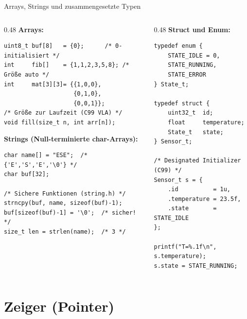 \documentclass[%
  aspectratio=169,
  10pt
]{beamer}
\begin{document}
\begin{frame}[fragile]{Arrays, Strings und zusammengesetzte Typen}
  \begin{columns}[T]
    \begin{column}{0.48\textwidth}
      \textbf{Arrays:}
\begin{lstlisting}
uint8_t buf[8]   = {0};      /* 0-initialisiert */
int     fib[]    = {1,1,2,3,5,8}; /* Größe auto */
int     mat[3][3]= {{1,0,0},
                    {0,1,0},
                    {0,0,1}};
/* Größe zur Laufzeit (C99 VLA) */
void fill(size_t n, int arr[n]);
\end{lstlisting}
      \textbf{Strings (Null-terminierte char-Arrays):}
\begin{lstlisting}
char name[] = "ESE";  /* {'E','S','E','\0'} */
char buf[32];

/* Sichere Funktionen (string.h) */
strncpy(buf, name, sizeof(buf)-1);
buf[sizeof(buf)-1] = '\0';  /* sicher! */
size_t len = strlen(name);  /* 3 */
\end{lstlisting}
    \end{column}
    \begin{column}{0.48\textwidth}
      \textbf{Struct und Enum:}
\begin{lstlisting}
typedef enum {
    STATE_IDLE = 0,
    STATE_RUNNING,
    STATE_ERROR
} State_t;

typedef struct {
    uint32_t  id;
    float     temperature;
    State_t   state;
} Sensor_t;

/* Designated Initializer (C99) */
Sensor_t s = {
    .id          = 1u,
    .temperature = 23.5f,
    .state       = STATE_IDLE
};

printf("T=%.1f\n", s.temperature);
s.state = STATE_RUNNING;
\end{lstlisting}
    \end{column}
  \end{columns}
\end{frame}

\section{Zeiger (Pointer)}
\end{document}
